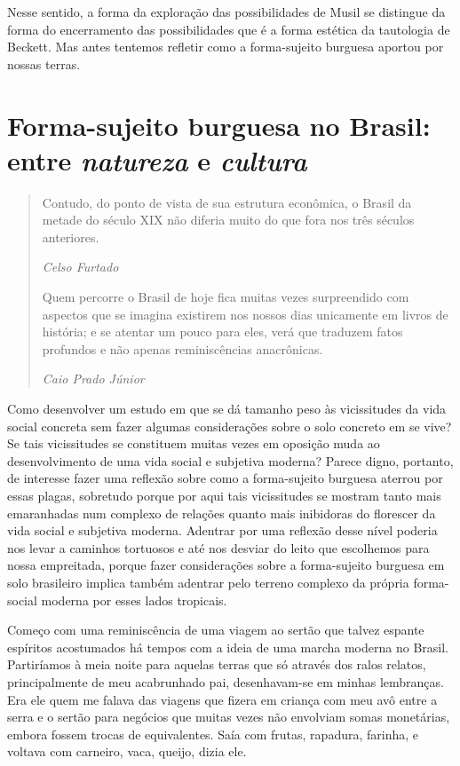 Nesse sentido, a forma da exploração das possibilidades de Musil se
distingue da forma do encerramento das possibilidades que é a forma
estética da tautologia de Beckett. Mas antes tentemos refletir como a
forma-sujeito burguesa aportou por nossas terras.

\chapter{Forma-sujeito burguesa no Brasil: entre \emph{natureza} e \emph{cultura}}

\begin{quote}
Contudo, do ponto de vista de sua estrutura econômica, o Brasil da
metade do século XIX não diferia muito do que fora nos três séculos
anteriores.

\emph{Celso Furtado}

Quem percorre o Brasil de hoje fica muitas vezes surpreendido com
aspectos que se imagina existirem nos nossos dias unicamente em livros
de história; e se atentar um pouco para eles, verá que traduzem fatos
profundos e não apenas reminiscências anacrônicas.

\emph{Caio Prado Júnior }
\end{quote}

Como desenvolver um estudo em que se dá tamanho peso às vicissitudes da
vida social concreta sem fazer algumas considerações sobre o solo
concreto em se vive? Se tais vicissitudes se constituem muitas vezes em
oposição muda ao desenvolvimento de uma vida social e subjetiva moderna?
Parece digno, portanto, de interesse fazer uma reflexão sobre como a
forma-sujeito burguesa aterrou por essas plagas, sobretudo porque por
aqui tais vicissitudes se mostram tanto mais emaranhadas num complexo de
relações quanto mais inibidoras do florescer da vida social e subjetiva
moderna. Adentrar por uma reflexão desse nível poderia nos levar a
caminhos tortuosos e até nos desviar do leito que escolhemos para nossa
empreitada, porque fazer considerações sobre a forma-sujeito burguesa em
solo brasileiro implica também adentrar pelo terreno complexo da própria
forma-social moderna por esses lados tropicais.

Começo com uma reminiscência de uma viagem ao sertão que talvez espante
espíritos acostumados há tempos com a ideia de uma marcha moderna no
Brasil. Partiríamos à meia noite para aquelas terras que só através dos
ralos relatos, principalmente de meu acabrunhado pai, desenhavam-se em
minhas lembranças. Era ele quem me falava das viagens que fizera em
criança com meu avô entre a serra e o sertão para negócios que muitas
vezes não envolviam somas monetárias, embora fossem trocas de
equivalentes. Saía com frutas, rapadura, farinha, e voltava com
carneiro, vaca, queijo, dizia ele.

